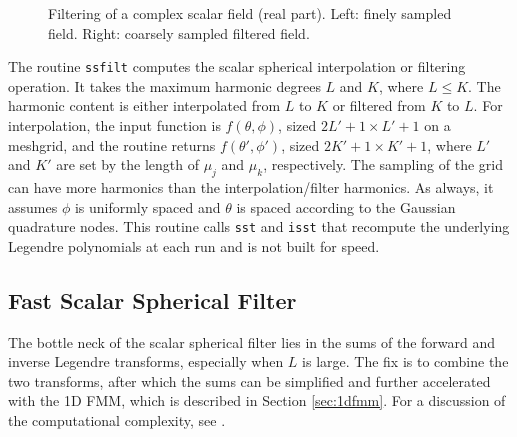  \begin{figure}[H] 
 \centering
{} 
\caption{Filtering of a complex scalar field (real part). Left: finely sampled field. Right: coarsely sampled filtered field. }
\end{figure}


The routine \texttt{ssfilt} computes the scalar spherical interpolation or filtering operation.  It takes the maximum harmonic degrees $L$ and $K$, where $L \le K$.  The harmonic content is either interpolated from $L$ to $K$ or filtered from $K$ to $L$.  For interpolation, the input function is $f(\theta,\phi)$, sized $2L'+1 \times L' + 1$ on a meshgrid, and the routine returns $f(\theta',\phi')$, sized $2K'+1 \times K'+1$, where $L'$ and $K'$ are set by the length of $\mu_j$ and $\mu_k$, respectively.  The sampling of the grid can have more harmonics than the interpolation/filter harmonics. As always, it assumes $\phi$ is uniformly spaced and $\theta$ is spaced according to the Gaussian quadrature nodes.  This routine calls \texttt{sst} and \texttt{isst} that recompute the underlying Legendre polynomials at each run and is not built for speed.  

{\footnotesize
{}
}

\clearpage

\subsection{Fast Scalar Spherical Filter}
\label{sec:fastscasphfilt}
The bottle neck of the scalar spherical filter lies in the sums of the forward and inverse Legendre transforms, especially when $L$ is large.  The fix is to combine the two transforms, after which the sums can be simplified and further accelerated with the 1D FMM, which is described in Section \ref{sec:1dfmm}. For a discussion of the computational complexity, see \cite{yucel2008helmholtz}.

